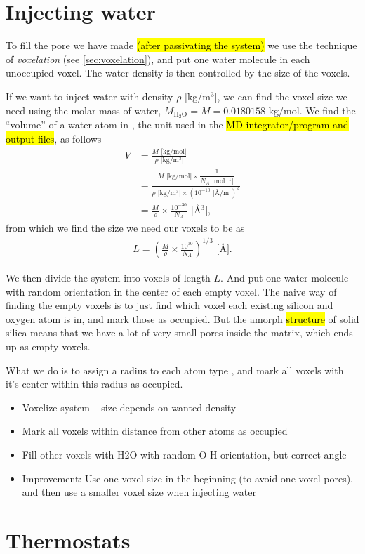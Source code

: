 \section{Injecting water}
To fill the pore we have made \hl{(after passivating the system)} we use the technique of \emph{voxelation} (see \cref{sec:voxelation}), and put one water molecule in each unoccupied voxel. The water density is then controlled by the size of the voxels.

If we want to inject water with density $\rho$ [kg/m$^3$], we can find the voxel size we need using the molar mass of water, $M_\text{H$_2$O} = M = 0.0180158 \text{ kg/mol}$. We find the ``volume'' of a water atom in \Ang, the unit used in the \hl{MD integrator/program and output files}, as follows
\begin{align*}
    V 
    &= \frac{ M\text{ [kg/mol]} }{ \rho\text{ [kg/m$^3$]} } \\
    &= \frac{
            M\text{ [kg/mol]} \times \dfrac{1}{N_A \text{ [mol$^{-1}$]}}
        }{
            \rho\text{ [kg/m$^3$]} \times \left(10^{-10} \text{ [\AA/m]}\right)^3
        } \\
    &= \frac{M}{\rho} \times \frac{10^{-30}}{N_A} \text{ [\AA$^3$]},
\end{align*}
from which we find the size we need our voxels to be as
\begin{align*}
    L = \left(\frac{M}{\rho} \times \frac{10^{30}}{N_A}\right)^{1/3}\text{ [\AA]}.
\end{align*}

We then divide the system into voxels of length $L$. And put one water molecule with random orientation in the center of each empty voxel. The naive way of finding the empty voxels is to just find which voxel each existing silicon and oxygen atom is in, and mark those as occupied. But the amorph \hl{structure} of solid silica means that we have a lot of very small pores inside the matrix, which ends up as empty voxels. 

What we do is to assign a radius to each atom type , and mark all voxels with it's center within this radius as occupied.

\begin{itemize}
    \item Voxelize system -- size depends on wanted density
    \item Mark all voxels within distance from other atoms as occupied
    \item Fill other voxels with H2O with random O-H orientation, but correct angle
    \item Improvement: Use one voxel size in the beginning (to avoid one-voxel pores), and then use a smaller voxel size when injecting water
\end{itemize}

\section{Thermostats}
